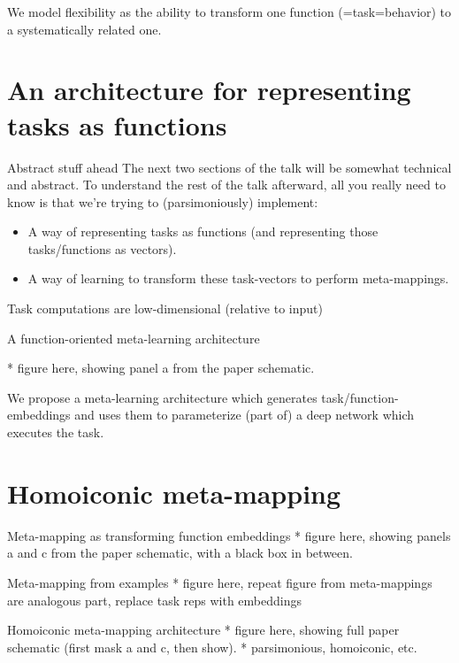 \documentclass{beamer}
\begin{document}
\begin{frame}[standout]
We model flexibility as the ability to transform one function (=task=behavior) to a systematically related one.
\end{frame}

\section{An architecture for representing tasks as functions}

\begin{frame}{Abstract stuff ahead}
The next two sections of the talk will be somewhat technical and abstract. To understand the rest of the talk afterward, all you really need to know is that we're trying to (parsimoniously) implement:
\begin{itemize}
\item A way of representing tasks as functions (and representing those tasks/functions as vectors).
\item A way of learning to transform these task-vectors to perform meta-mappings.
\end{itemize}
\end{frame}

\begin{frame}{Task computations are low-dimensional (relative to input)}

\end{frame}

\begin{frame}{A function-oriented meta-learning architecture}

* figure here, showing panel a from the paper schematic.
\end{frame}

\begin{frame}[standout]
We propose a meta-learning architecture which generates task/function-embeddings and uses them to parameterize (part of) a deep network which executes the task. %
\end{frame}

\section{Homoiconic meta-mapping}

\begin{frame}{Meta-mapping as transforming function embeddings}
* figure here, showing panels a and c from the paper schematic, with a black box in between.
\end{frame}

\begin{frame}{Meta-mapping from examples}
* figure here, repeat figure from meta-mappings are analogous part, replace task reps with embeddings 
\end{frame}

\begin{frame}{Homoiconic meta-mapping architecture}
* figure here, showing full paper schematic (first mask a and c, then show). 
* parsimonious, homoiconic, etc.
\end{frame}
\end{document}
